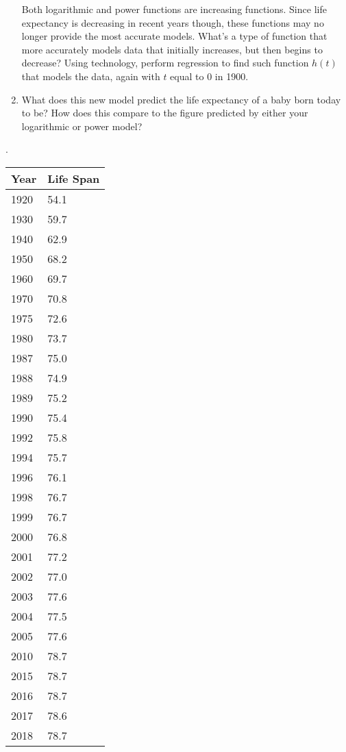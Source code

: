\begin{minipage}[t]{0.8\textwidth}
\begin{enumerate}
            Both logarithmic and power functions are increasing functions.
            Since life expectancy is decreasing in recent years though,
            these functions may no longer provide the most accurate models.
            What's a type of function that more accurately models
            data that initially increases, but then begins to decrease?
            Using technology, perform regression to
            find such function \(h(t)\) 
            that models the data,
            again with \(t\) equal to \(0\) in 1900.

\item 
    What does this new model predict
            the life expectancy of a baby born today to be?
            How does this compare to the figure predicted
            by either your logarithmic or power model?

    \end{enumerate}

\end{minipage}
.
\hspace{1em}
\begin{minipage}[t]{0.19\textwidth}
\par\begin{center}\begin{tabular}{l|l}
Year & Life Span \\\hline
    1920 & 54.1 \\
    1930 & 59.7 \\
    1940 & 62.9 \\
    1950 & 68.2 \\
    1960 & 69.7 \\
    1970 & 70.8 \\
    1975 & 72.6 \\
    1980 & 73.7 \\
    1987 & 75.0 \\
    1988 & 74.9 \\
    1989 & 75.2 \\
    1990 & 75.4 \\
    1992 & 75.8 \\
    1994 & 75.7 \\
    1996 & 76.1 \\
    1998 & 76.7 \\
    1999 & 76.7 \\
    2000 & 76.8 \\
    2001 & 77.2 \\
    2002 & 77.0 \\
    2003 & 77.6 \\
    2004 & 77.5 \\
    2005 & 77.6 \\
    2010 & 78.7 \\
    2015 & 78.7 \\
    2016 & 78.7 \\
    2017 & 78.6 \\
    2018 & 78.7
\end{tabular}\end{center}
\end{minipage}



